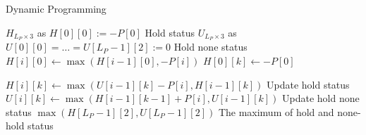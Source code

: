 \setcounter{algorithm}{0}
\begin{algorithm}[H]
\caption{Dynamic Programming}
\begin{algorithmic}[1]
\State $H_{L_P\times 3}$ as $H[0][0]:=-P[0]$  \Comment Hold status
\State $U_{L_P\times 3}$ as $U[0][0]=\ldots=U[L_P-1][2]:=0$ \Comment Hold none status
\State $H[i][0]\gets\max(H[i-1][0], -P[i])$
\EndFor 
{}
\State $H[0][k]\gets -P[0]$
\EndFor
{}
\end{algorithmic}
\end{algorithm}
\begin{algorithm}[H]
\begin{algorithmic}[1]
\State $H[i][k]\gets \max(U[i-1][k]-P[i], H[i-1][k])$ \Comment Update hold status
\State $U[i][k]\gets \max(H[i-1][k-1] + P[i], U[i-1][k])$ \Comment Update hold none status
\EndFor
\EndFor
\State \Return $\max(H[L_P-1][2], U[L_P-1][2])$ \Comment The maximum of hold and none-hold status
\EndProcedure
\end{algorithmic}
\end{algorithm}
